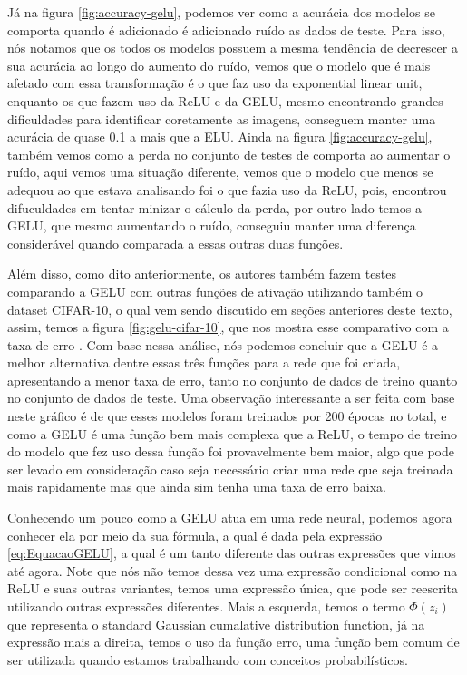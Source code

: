 Já na figura \ref{fig:accuracy-gelu}, podemos ver como a acurácia dos modelos se comporta quando é adicionado é adicionado ruído as dados de teste. Para isso, nós notamos que os todos os modelos possuem a mesma tendência de decrescer a sua acurácia ao longo do aumento do ruído, vemos que o modelo que é mais afetado com essa transformação é o que faz uso da exponential linear unit, enquanto os que fazem uso da ReLU e da GELU, mesmo encontrando grandes dificuldades para identificar coretamente as imagens, conseguem manter uma acurácia de quase 0.1 a mais que a ELU. Ainda na figura \ref{fig:accuracy-gelu}, também vemos como a perda no conjunto de testes de comporta ao aumentar o ruído, aqui vemos uma situação diferente, vemos que o modelo que menos se adequou ao que estava analisando foi o que fazia uso da ReLU, pois, encontrou difuculdades em tentar minizar o cálculo da perda, por outro lado temos a GELU, que mesmo aumentando o ruído, conseguiu manter uma diferença considerável quando comparada a essas outras duas funções.

Além disso, como dito anteriormente, os autores também fazem testes comparando a GELU com outras funções de ativação utilizando também o dataset CIFAR-10, o qual vem sendo discutido em seções anteriores deste texto, assim, temos a figura \ref{fig:gelu-cifar-10}, que nos mostra esse comparativo com a taxa de erro \parencite{gelu}. Com base nessa análise, nós podemos concluir que a GELU é a melhor alternativa dentre essas três funções para a rede que foi criada, apresentando a menor taxa de erro, tanto no conjunto de dados de treino quanto no conjunto de dados de teste. Uma observação interessante a ser feita com base neste gráfico é de que esses modelos foram treinados por 200 épocas no total, e como a GELU é uma função bem mais complexa que a ReLU, o tempo de treino do modelo que fez uso dessa função foi provavelmente bem maior, algo que pode ser levado em consideração caso seja necessário criar uma rede que seja treinada mais rapidamente mas que ainda sim tenha uma taxa de erro baixa.

Conhecendo um pouco como a GELU atua em uma rede neural, podemos agora conhecer ela por meio da sua fórmula, a qual é dada pela expressão \ref{eq:EquacaoGELU}, a qual é um tanto diferente das outras expressões que vimos até agora. Note que nós não temos dessa vez uma expressão condicional como na ReLU e suas outras variantes, temos uma expressão única, que pode ser reescrita utilizando outras expressões diferentes. Mais a esquerda, temos o termo $\Phi(z_i)$ que representa o standard Gaussian cumalative distribution function, já na expressão mais a direita, temos o uso da função erro, uma função bem comum de ser utilizada quando estamos trabalhando com conceitos probabilísticos.


